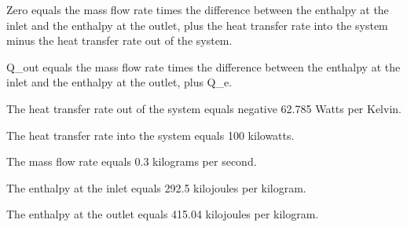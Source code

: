 Zero equals the mass flow rate times the difference between the enthalpy at the inlet and the enthalpy at the outlet, plus the heat transfer rate into the system minus the heat transfer rate out of the system.

Q_out equals the mass flow rate times the difference between the enthalpy at the inlet and the enthalpy at the outlet, plus Q_e.

The heat transfer rate out of the system equals negative 62.785 Watts per Kelvin.

The heat transfer rate into the system equals 100 kilowatts.

The mass flow rate equals 0.3 kilograms per second.

The enthalpy at the inlet equals 292.5 kilojoules per kilogram.

The enthalpy at the outlet equals 415.04 kilojoules per kilogram.